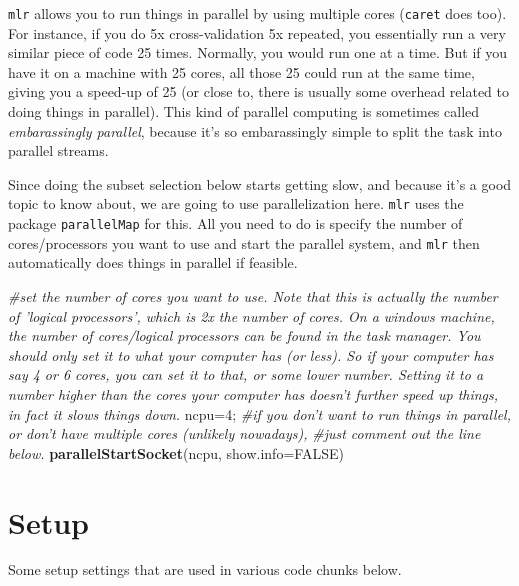 \documentclass[]{article}
\newenvironment{Shaded}{\begin{snugshade}}{\end{snugshade}}
\newcommand{\CommentTok}[1]{\textcolor[rgb]{0.56,0.35,0.01}{\textit{#1}}}
\newcommand{\DataTypeTok}[1]{\textcolor[rgb]{0.13,0.29,0.53}{#1}}
\newcommand{\DecValTok}[1]{\textcolor[rgb]{0.00,0.00,0.81}{#1}}
\newcommand{\KeywordTok}[1]{\textcolor[rgb]{0.13,0.29,0.53}{\textbf{#1}}}
\newcommand{\NormalTok}[1]{#1}
\newcommand{\OtherTok}[1]{\textcolor[rgb]{0.56,0.35,0.01}{#1}}
\begin{document}
\texttt{mlr} allows you to run things in parallel by using multiple
cores (\texttt{caret} does too). For instance, if you do 5x
cross-validation 5x repeated, you essentially run a very similar piece
of code 25 times. Normally, you would run one at a time. But if you have
it on a machine with 25 cores, all those 25 could run at the same time,
giving you a speed-up of 25 (or close to, there is usually some overhead
related to doing things in parallel). This kind of parallel computing is
sometimes called \emph{embarassingly parallel}, because it's so
embarassingly simple to split the task into parallel streams.

Since doing the subset selection below starts getting slow, and because
it's a good topic to know about, we are going to use parallelization
here. \texttt{mlr} uses the package \texttt{parallelMap} for this. All
you need to do is specify the number of cores/processors you want to use
and start the parallel system, and \texttt{mlr} then automatically does
things in parallel if feasible.

\begin{Shaded}
\begin{Highlighting}[]
\CommentTok{#set the number of cores you want to use. Note that this is actually the number of 'logical processors', which is 2x the number of cores. On a windows machine, the number of cores/logical processors can be found in the task manager. You should only set it to what your computer has (or less). So if your computer has say 4 or 6 cores, you can set it to that, or some lower number. Setting it to a number higher than the cores your computer has doesn't further speed up things, in fact it slows things down.}
\NormalTok{ncpu=}\DecValTok{4}\NormalTok{;}
\CommentTok{#if you don't want to run things in parallel, or don't have multiple cores (unlikely nowadays), }
\CommentTok{#just comment out the line below.}
\KeywordTok{parallelStartSocket}\NormalTok{(ncpu, }\DataTypeTok{show.info=}\OtherTok{FALSE}\NormalTok{) }
\end{Highlighting}
\end{Shaded}

\hypertarget{setup}{%
\section{Setup}\label{setup}}

Some setup settings that are used in various code chunks below.
\end{document}
